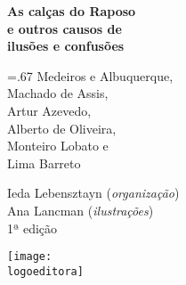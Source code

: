 




\begingroup\thispagestyle{empty}\vspace*{-.01\textheight}\parindent=0pt 
              {\Huge 
              \latobf
              \textbf{As calças do Raposo\\ e outros causos de\\ ilusões e confusões}\par
              }

              \vspace{15mm}
              
              \Large
              {\baselineskip=.67\baselineskip 
              Medeiros e Albuquerque,\\
              Machado de Assis,\\
              Artur Azevedo,\\
              Alberto de Oliveira,\\
              Monteiro Lobato e \\
              Lima Barreto}
              
              \vspace{15mm}

              {\small
              Ieda Lebensztayn (\textit{organização})\vspace*{-10pt}\\
              Ana Lancman (\textit{ilustrações})}\\
              {\footnotesize
              1ª edição}
                    
              \vfill

              \texttt{[image: \\logoeditora]}
       

              {\small
              \publisherstate  \quad\the\year}
\endgroup

\pagebreak
